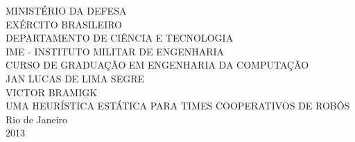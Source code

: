 \begin{titlepage}

\begin{center}
\large{MINISTÉRIO DA DEFESA} \\
\large{EXÉRCITO BRASILEIRO} \\
\large{DEPARTAMENTO DE CIÊNCIA E TECNOLOGIA}\\
\large{IME - INSTITUTO MILITAR DE ENGENHARIA} \\
\large{CURSO DE GRADUAÇÃO EM ENGENHARIA DA COMPUTAÇÃO} \\
\vspace{5 cm}
\large{JAN LUCAS DE LIMA SEGRE} \\
\large{VICTOR BRAMIGK} \\
\vspace{5 cm}
\large{UMA HEURÍSTICA ESTÁTICA PARA TIMES COOPERATIVOS DE ROBÔS}\\
\vspace{5 cm}
Rio de Janeiro\\
2013
\end{center}

\end{titlepage}

%
%
%
%
%
%
%
%
%
%
%
%
%
